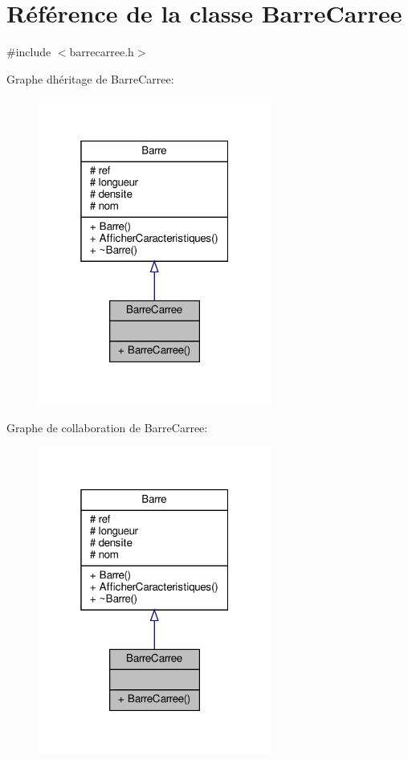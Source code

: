 \hypertarget{class_barre_carree}{}\section{Référence de la classe Barre\+Carree}
\label{class_barre_carree}


{\ttfamily \#include $<$barrecarree.\+h$>$}



Graphe d\textquotesingle{}héritage de Barre\+Carree\+:
\nopagebreak
\begin{figure}[H]
\begin{center}
\leavevmode
\includegraphics[width=217pt]{class_barre_carree__inherit__graph}
\end{center}
\end{figure}


Graphe de collaboration de Barre\+Carree\+:
\nopagebreak
\begin{figure}[H]
\begin{center}
\leavevmode
\includegraphics[width=217pt]{class_barre_carree__coll__graph}
\end{center}
\end{figure}
